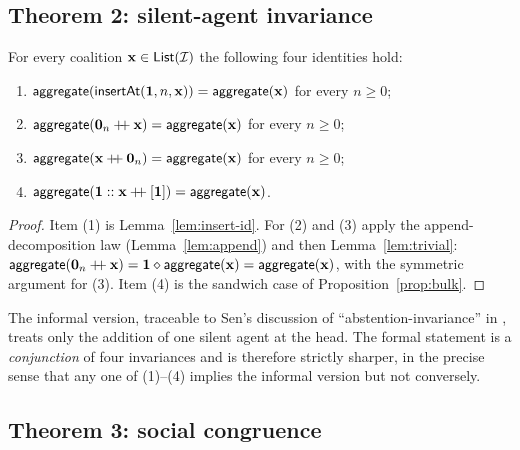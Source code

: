 \subsection*{Theorem 2: silent-agent invariance}

\begin{theorem}\label{thm:silent}
For every coalition $\mathbf{x} \in \mathsf{List}(\mathcal{I})$ the following four
identities hold:
\begin{enumerate}
\item $\mathsf{aggregate}(\mathsf{insertAt}(\mathbf{1}, n, \mathbf{x})) = \mathsf{aggregate}(\mathbf{x})$ for
  every $n \geq 0$;
\item $\mathsf{aggregate}(\mathbf{0}_n \mathbin{+\!\!+} \mathbf{x}) = \mathsf{aggregate}(\mathbf{x})$ for every
  $n \geq 0$;
\item $\mathsf{aggregate}(\mathbf{x} \mathbin{+\!\!+} \mathbf{0}_n) = \mathsf{aggregate}(\mathbf{x})$ for every
  $n \geq 0$;
\item $\mathsf{aggregate}(\mathbf{1} :: \mathbf{x} \mathbin{+\!\!+} [\mathbf{1}]) = \mathsf{aggregate}(\mathbf{x})$.
\end{enumerate}
\end{theorem}

\begin{proof}
Item (1) is Lemma~\ref{lem:insert-id}. For (2) and (3) apply the
append-decomposition law (Lemma~\ref{lem:append}) and then
Lemma~\ref{lem:trivial}: $\mathsf{aggregate}(\mathbf{0}_n \mathbin{+\!\!+} \mathbf{x}) = \mathbf{1}
\mathbin{\diamond} \mathsf{aggregate}(\mathbf{x}) = \mathsf{aggregate}(\mathbf{x})$, with the symmetric
argument for (3). Item (4) is the sandwich case of
Proposition~\ref{prop:bulk}.
\end{proof}

The informal version, traceable to Sen's discussion of
``abstention-invariance'' in \cite{Sen1970}, treats only the
addition of one silent agent at the head. The formal statement is a
\emph{conjunction} of four invariances and is therefore strictly
sharper, in the precise sense that any one of (1)--(4) implies the
informal version but not conversely.

\subsection*{Theorem 3: social congruence}

